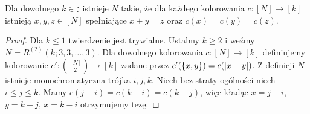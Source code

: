 \begin{theorem}[Schur]
	Dla dowolnego \(k \in \natural\) istnieje \(N\) takie, że dla każdego kolorowania \(c: [N] \to [k]\) istnieją \(x,y,z\in[N]\)
	spełniające \(x+y=z\) oraz \(c(x)=c(y)=c(z)\).
\end{theorem}
\begin{proof}
	Dla \(k \leq 1\) twierdzenie jest trywialne.
	Ustalmy \(k\ge 2\) i weźmy \(N = R^{(2)}(k; 3,3,\ldots,3)\). Dla dowolnego kolorowania \(c: [N]\to [k]\) definiujemy
	kolorowanie \(c':\binom{[N]}{2}\to [k]\) zadane przez \(c'(\set{x,y}) = c(|x-y|)\). Z definicji \(N\) istnieje
	monochromatyczna trójka \(i,j,k\). Niech bez straty ogólności niech \(i \leq j \leq k\). Mamy \(c(j-i) = c(k-i) = c(k-j)\),
	więc kładąc \(x=j-i\), \(y=k-j\), \(x=k-i\) otrzymujemy tezę.
\end{proof}


